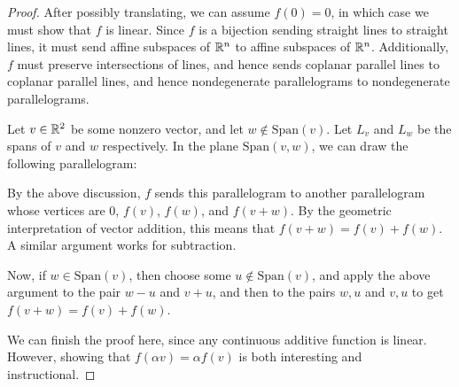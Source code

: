 \begin{proof}
  After possibly translating, we can assume $f(0) = 0$, in which 
  case we must show that $f$ is linear. Since $f$ is a 
  bijection sending straight lines to straight lines, it must 
  send affine subspaces of $\mathbb{R}^n$ to affine subspaces of 
  $\mathbb{R}^n$. Additionally, $f$ must preserve intersections of 
  lines, and hence sends coplanar parallel lines to coplanar 
  parallel lines, and hence nondegenerate parallelograms 
  to nondegenerate parallelograms.
  
  Let $v\in \mathbb{R}^2$ be some nonzero vector, and let 
  $w\not\in \mathrm{Span}(v)$. Let $L_v$ and 
  $L_w$ be the spans of $v$ and $w$ respectively. 
  In the plane $\mathrm{Span}(v,w)$, 
  we can draw the following parallelogram:
  \begin{figure}
    \centering
  \end{figure}
  By the above discussion, $f$ sends this parallelogram 
  to another parallelogram whose vertices are 
  $0$, $f(v)$, $f(w)$, and $f(v+w)$. By the geometric 
  interpretation of vector addition, this means that 
  $f(v+w) = f(v)+f(w)$. A similar argument works for 
  subtraction.
  
  Now, if $w\in \mathrm{Span}(v)$, then choose some 
  $u\not\in\mathrm{Span}(v)$, and apply the above argument to 
  the pair $w-u$ and $v+u$, and then to the pairs 
  $w,u$ and $v,u$ to get $f(v+w) = f(v) + f(w)$.

  We can finish the proof here, since any continuous 
  additive function is linear. However, showing that 
  $f(\alpha v) = \alpha f(v)$ is both interesting and instructional.


\end{proof}

